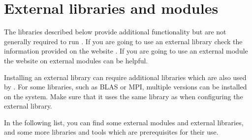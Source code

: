 \section{External libraries and modules} \label{sec:external-modules-libraries}
The libraries described below provide additional functionality but are not generally required to run \Dumux. 
If you are going to use an external library check the information provided on the \Dune website \cite{DUNE-EXT-LIB}.
If you are going to use an external \Dune module the website on external modules \cite{DUNE-EXT-MOD} can be helpful.

Installing an external library can require additional libraries which are also used by \Dune. 
For some libraries, such as BLAS or MPI, multiple versions can be installed on the system.
Make sure that it uses the same library as \Dune when configuring the external library.

In the following list, you can find some external modules and external libraries, and some more libraries and tools which are prerequisites for their use.

